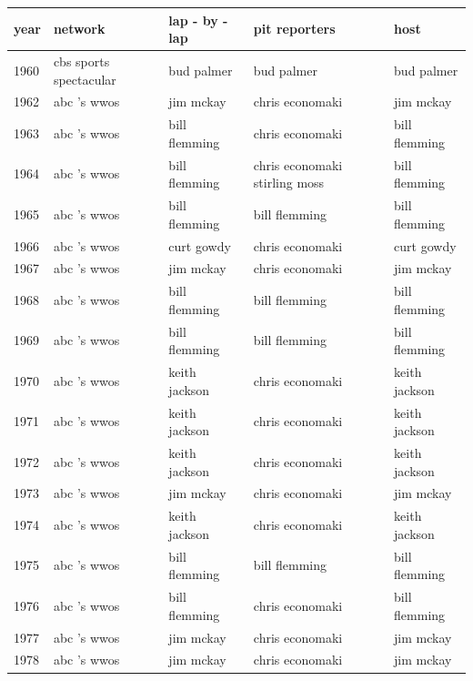 \documentclass{article}
\begin{document}
\begin{tabular}{lllll}
\toprule
year & network & lap - by - lap & pit reporters & host \\
\midrule
1960 & cbs sports spectacular & bud palmer & bud palmer & bud palmer \\
1962 & abc 's wwos & jim mckay & chris economaki & jim mckay \\
1963 & abc 's wwos & bill flemming & chris economaki & bill flemming \\
1964 & abc 's wwos & bill flemming & chris economaki stirling moss & bill flemming \\
1965 & abc 's wwos & bill flemming & bill flemming & bill flemming \\
1966 & abc 's wwos & curt gowdy & chris economaki & curt gowdy \\
1967 & abc 's wwos & jim mckay & chris economaki & jim mckay \\
1968 & abc 's wwos & bill flemming & bill flemming & bill flemming \\
1969 & abc 's wwos & bill flemming & bill flemming & bill flemming \\
1970 & abc 's wwos & keith jackson & chris economaki & keith jackson \\
1971 & abc 's wwos & keith jackson & chris economaki & keith jackson \\
1972 & abc 's wwos & keith jackson & chris economaki & keith jackson \\
1973 & abc 's wwos & jim mckay & chris economaki & jim mckay \\
1974 & abc 's wwos & keith jackson & chris economaki & keith jackson \\
1975 & abc 's wwos & bill flemming & bill flemming & bill flemming \\
1976 & abc 's wwos & bill flemming & chris economaki & bill flemming \\
1977 & abc 's wwos & jim mckay & chris economaki & jim mckay \\
1978 & abc 's wwos & jim mckay & chris economaki & jim mckay \\
\bottomrule
\end{tabular}
\end{document}
